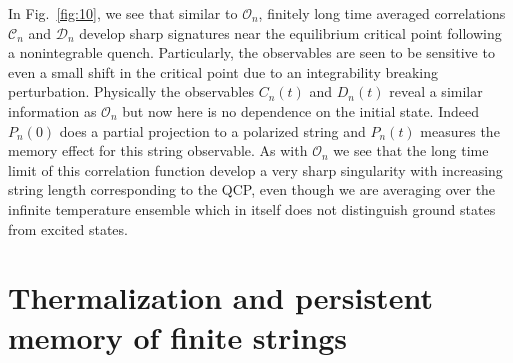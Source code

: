 \documentclass[aps,prx,twocolumn]{revtex4-2}
\begin{document}
In Fig.~\ref{fig:10}, we see that similar to $\mathcal{O}_n$, finitely long time averaged correlations $\mathcal{C}_n$ and $\mathcal{D}_n$ develop sharp signatures near the equilibrium critical point following a nonintegrable quench. Particularly, the observables are seen to be sensitive to even a small shift in the critical point due to an integrability breaking perturbation.   {Physically the observables $C_n(t)$ and $D_n(t)$ reveal a similar information as $\mathcal{O}_n$ but now here is no dependence on the initial state.  Indeed $P_n(0)$ does a partial projection to a polarized string and $P_n(t)$ measures the memory effect for this string observable.  As with $\mathcal{O}_n$ we see that the long time limit of this correlation function develop a very sharp singularity with increasing string length corresponding to the QCP, even though we are averaging over the infinite temperature ensemble which in itself does not distinguish ground states from excited states.}\\

\section{Thermalization and persistent memory of finite strings}
\label{Sec:memory}
\end{document}
